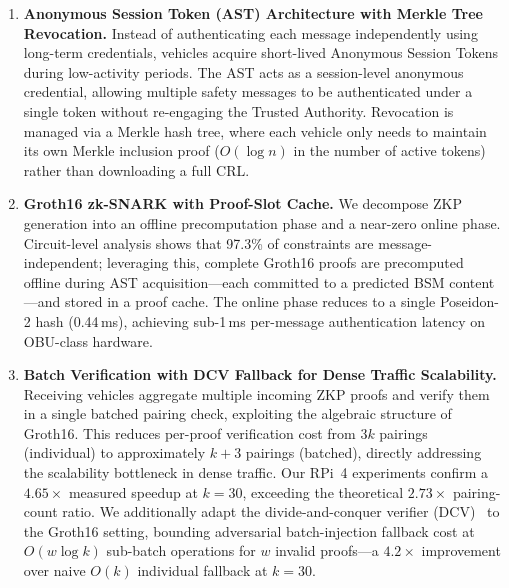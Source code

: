 \begin{enumerate}
    \item \textbf{Anonymous Session Token (AST) Architecture with Merkle Tree
    Revocation.} Instead of authenticating each message independently using
    long-term credentials, vehicles acquire short-lived Anonymous Session Tokens
    during low-activity periods. The AST acts as a session-level anonymous
    credential, allowing multiple safety messages to be authenticated under a
    single token without re-engaging the Trusted Authority. Revocation is managed
    via a Merkle hash tree, where each vehicle only needs to maintain its own
    Merkle inclusion proof ($O(\log n)$ in the number of active tokens) rather than
    downloading a full CRL.

    \item \textbf{Groth16 zk-SNARK with Proof-Slot Cache.} We decompose ZKP
    generation into an offline precomputation phase and a near-zero online phase.
    Circuit-level analysis shows that 97.3\% of constraints are message-independent;
    leveraging this, complete Groth16 proofs are precomputed offline during AST
    acquisition---each committed to a predicted BSM content---and stored in a proof
    cache. The online phase reduces to a single Poseidon-2 hash (0.44\,ms), achieving
    sub-1\,ms per-message authentication latency on OBU-class hardware.

    \item \textbf{Batch Verification with DCV Fallback for Dense Traffic Scalability.}
    Receiving vehicles aggregate multiple incoming ZKP proofs and verify them in a
    single batched pairing check, exploiting the algebraic structure of Groth16. This
    reduces per-proof verification cost from $3k$ pairings (individual) to
    approximately $k+3$ pairings (batched), directly addressing the scalability
    bottleneck in dense traffic. Our RPi~4 experiments confirm a $\mathbf{4.65\times}$
    measured speedup at $k=30$, exceeding the theoretical $2.73\times$ pairing-count
    ratio. We additionally adapt the divide-and-conquer verifier
    (DCV)~\cite{ferrara2008finding} to the Groth16 setting, bounding adversarial
    batch-injection fallback cost at $O(w \log k)$ sub-batch operations for $w$
    invalid proofs---a $4.2\times$ improvement over naive $O(k)$ individual fallback
    at $k=30$.
\end{enumerate}
